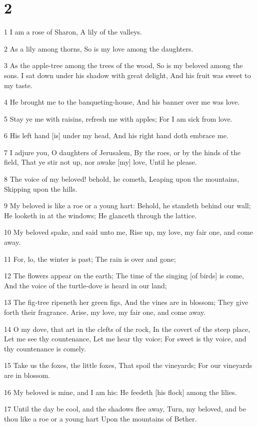 \chapter{2}

\par 1 I am a rose of Sharon, A lily of the valleys.
\par 2 As a lily among thorns, So is my love among the daughters.
\par 3 As the apple-tree among the trees of the wood, So is my beloved among the sons. I sat down under his shadow with great delight, And his fruit was sweet to my taste.
\par 4 He brought me to the banqueting-house, And his banner over me was love.
\par 5 Stay ye me with raisins, refresh me with apples; For I am sick from love.
\par 6 His left hand [is] under my head, And his right hand doth embrace me.
\par 7 I adjure you, O daughters of Jerusalem, By the roes, or by the hinds of the field, That ye stir not up, nor awake [my] love, Until he please.
\par 8 The voice of my beloved! behold, he cometh, Leaping upon the mountains, Skipping upon the hills.
\par 9 My beloved is like a roe or a young hart: Behold, he standeth behind our wall; He looketh in at the windows; He glanceth through the lattice.
\par 10 My beloved spake, and said unto me, Rise up, my love, my fair one, and come away.
\par 11 For, lo, the winter is past; The rain is over and gone;
\par 12 The flowers appear on the earth; The time of the singing [of birds] is come, And the voice of the turtle-dove is heard in our land;
\par 13 The fig-tree ripeneth her green figs, And the vines are in blossom; They give forth their fragrance. Arise, my love, my fair one, and come away.
\par 14 O my dove, that art in the clefts of the rock, In the covert of the steep place, Let me see thy countenance, Let me hear thy voice; For sweet is thy voice, and thy countenance is comely.
\par 15 Take us the foxes, the little foxes, That spoil the vineyards; For our vineyards are in blossom.
\par 16 My beloved is mine, and I am his: He feedeth [his flock] among the lilies.
\par 17 Until the day be cool, and the shadows flee away, Turn, my beloved, and be thou like a roe or a young hart Upon the mountains of Bether.

